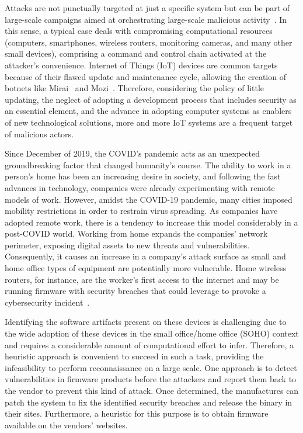 Attacks are not punctually targeted at just a specific system but can be part of large-scale campaigns aimed at orchestrating large-scale malicious activity~\cite{iotbotnet}. In this sense, a typical case deals with compromising computational resources (computers, smartphones, wireless routers, monitoring cameras, and many other small devices), comprising a command and control chain activated at the attacker's convenience. Internet of Things (IoT) devices are common targets because of their flawed update and maintenance cycle, allowing the creation of botnets like Mirai~\cite{mirai} and Mozi~\cite{mozi}. Therefore, considering the policy of little updating, the neglect of adopting a development process that includes security as an essential element, and the advance in adopting computer systems as enablers of new technological solutions, more and more IoT systems are a frequent target of malicious actors.

Since December of 2019, the COVID's pandemic acts as an unexpected groundbreaking factor that changed humanity's course.  The ability to work in a person's home has been an increasing desire in society, and following the fast advances in technology, companies were already experimenting with remote models of work. However, amidst the COVID-19 pandemic, many cities imposed mobility restrictions in order to restrain virus spreading.  As companies have adopted remote work, there is a tendency to increase this model considerably in a post-COVID world.  Working from home expands the companies' network perimeter, exposing digital assets to new threats and vulnerabilities. Consequently, it causes an increase in a company's attack surface as small and home office types of equipment are potentially more vulnerable. Home wireless routers, for instance, are the worker's first access to the internet and may be running firmware with security breaches that could leverage to provoke a cybersecurity incident~\cite{soho}.

Identifying the software artifacts present on these devices is challenging due to the wide adoption of these devices in the small office/home office (SOHO) context and requires a considerable amount of computational effort to infer. Therefore, a heuristic approach is convenient to succeed in such a task, providing the infeasibility to perform reconnaissance on a large scale. One approach is to detect vulnerabilities in firmware products before the attackers and report them back to the vendor to prevent this kind of attack. Once determined, the manufactures can patch the system to fix the identified security breaches and release the binary in their sites.  Furthermore, a heuristic for this purpose is to obtain firmware available on the vendors' websites.  


